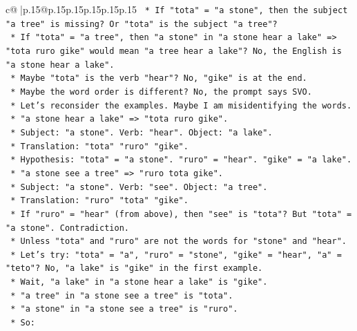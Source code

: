 \documentclass{article}
\begin{document}
{\begin{supertabular}{c@{$\;$}|p{.15\linewidth}@{}p{.15\linewidth}p{.15\linewidth}p{.15\linewidth}p{.15\linewidth}p{.15\linewidth}}
{{{\texttt{                    *   If "tota" = "a stone", then the subject "a tree" is missing? Or "tota" is the subject "a tree"?} \\
\texttt{                    *   If "tota" = "a tree", then "a stone" in "a stone hear a lake" => "tota ruro gike" would mean "a tree hear a lake"? No, the English is "a stone hear a lake".} \\
\texttt{                    *   Maybe "tota" is the verb "hear"? No, "gike" is at the end.} \\
\texttt{                    *   Maybe the word order is different? No, the prompt says SVO.} \\
\texttt{                    *   Let's reconsider the examples. Maybe I am misidentifying the words.} \\
\texttt{                    *   "a stone hear a lake" => "tota ruro gike".} \\
\texttt{                        *   Subject: "a stone". Verb: "hear". Object: "a lake".} \\
\texttt{                        *   Translation: "tota" "ruro" "gike".} \\
\texttt{                        *   Hypothesis: "tota" = "a stone". "ruro" = "hear". "gike" = "a lake".} \\
\texttt{                    *   "a stone see a tree" => "ruro tota gike".} \\
\texttt{                        *   Subject: "a stone". Verb: "see". Object: "a tree".} \\
\texttt{                        *   Translation: "ruro" "tota" "gike".} \\
\texttt{                        *   If "ruro" = "hear" (from above), then "see" is "tota"? But "tota" = "a stone". Contradiction.} \\
\texttt{                    *   Unless "tota" and "ruro" are not the words for "stone" and "hear".} \\
\texttt{                    *   Let's try: "tota" = "a", "ruro" = "stone", "gike" = "hear", "a" = "teto"? No, "a lake" is "gike" in the first example.} \\
\texttt{                    *   Wait, "a lake" in "a stone hear a lake" is "gike".} \\
\texttt{                    *   "a tree" in "a stone see a tree" is "tota".} \\
\texttt{                    *   "a stone" in "a stone see a tree" is "ruro".} \\
\texttt{                    *   So:} \\
}}}
\end{supertabular}}
\end{document}
